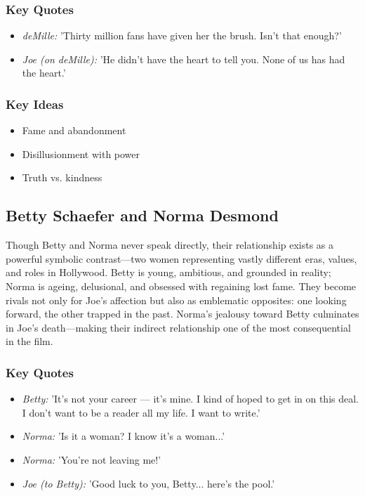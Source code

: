 \documentclass[a4paper]{article}
\begin{document}
\subsubsection*{Key Quotes}
\begin{itemize}
    \item \textit{deMille:} 'Thirty million fans have given her the brush. Isn’t that enough?'
    \item \textit{Joe (on deMille):} 'He didn’t have the heart to tell you. None of us has had the heart.'
\end{itemize}

\subsubsection*{Key Ideas}
\begin{itemize}
    \item Fame and abandonment
    \item Disillusionment with power
    \item Truth vs. kindness
\end{itemize}

\subsection{Betty Schaefer and Norma Desmond}
Though Betty and Norma never speak directly, their relationship exists as a powerful symbolic contrast—two women representing vastly different eras, values, and roles in Hollywood. Betty is young, ambitious, and grounded in reality; Norma is ageing, delusional, and obsessed with regaining lost fame. They become rivals not only for Joe’s affection but also as emblematic opposites: one looking forward, the other trapped in the past. Norma’s jealousy toward Betty culminates in Joe’s death—making their indirect relationship one of the most consequential in the film.

\subsubsection*{Key Quotes}
\begin{itemize}
    \item \textit{Betty:} 'It’s not your career — it’s mine. I kind of hoped to get in on this deal. I don’t want to be a reader all my life. I want to write.'
    \item \textit{Norma:} 'Is it a woman? I know it's a woman...'
    \item \textit{Norma:} 'You're not leaving me!'
    \item \textit{Joe (to Betty):} 'Good luck to you, Betty... here's the pool.'
\end{itemize}
\end{document}
